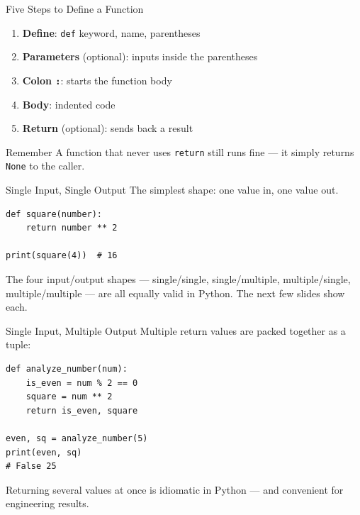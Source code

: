 \documentclass[9pt,aspectratio=169,xcolor=table]{beamer}
\begin{document}
\begin{frame}{Five Steps to Define a Function}
    \leavevmode
    \begin{enumerate}
        \item \textbf{Define}: \texttt{def} keyword, name, parentheses
        \item \textbf{Parameters} (optional): inputs inside the parentheses
        \item \textbf{Colon \texttt{:}}: starts the function body
        \item \textbf{Body}: indented code
        \item \textbf{Return} (optional): sends back a result
    \end{enumerate}

    \vspace{3mm}
    \begin{block}{Remember}
        A function that never uses \texttt{return} still runs fine ---
        it simply returns \texttt{None} to the caller.
    \end{block}
\end{frame}

\begin{frame}[fragile]{Single Input, Single Output}
    \leavevmode
    The simplest shape: one value in, one value out.

\begin{lstlisting}
def square(number):
    return number ** 2

print(square(4))  # 16
\end{lstlisting}

    \vspace{3mm}
    {\small The four input/output shapes --- single/single,
    single/multiple, multiple/single, multiple/multiple --- are all
    equally valid in Python. The next few slides show each.}
\end{frame}

\begin{frame}[fragile]{Single Input, Multiple Output}
    \leavevmode
    Multiple return values are packed together as a \alert{tuple}:

\begin{lstlisting}
def analyze_number(num):
    is_even = num % 2 == 0
    square = num ** 2
    return is_even, square

even, sq = analyze_number(5)
print(even, sq)
# False 25
\end{lstlisting}

    \vspace{1mm}
    {\small Returning several values at once is idiomatic in Python ---
    and convenient for engineering results.}
\end{frame}
\end{document}

